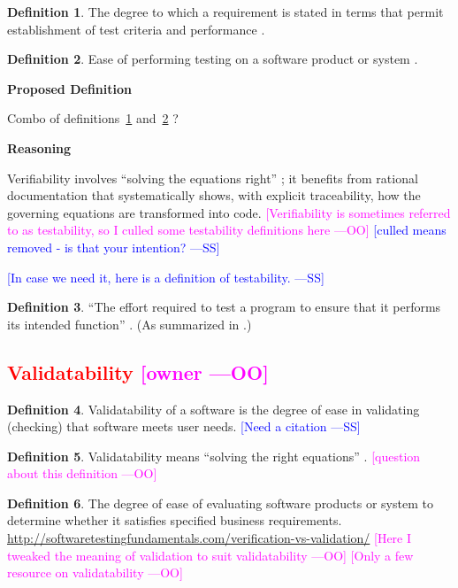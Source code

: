 \documentclass[letterpaper,cleveref]{lipics-v2019}
\newcommand{\authornote}[3]{\textcolor{#1}{[#3 ---#2]}}
\newcommand{\authornote}[3]{}
\newcommand{\wss}[1]{\authornote{blue}{SS}{#1}} %
\newcommand{\oo}[1]{\authornote{magenta}{OO}{#1}} %
\newcommand{\notdone}[1]{\textcolor{red}{#1}}
\theoremstyle{definition}
\newtheorem{defn}{Definition}
\begin{document}
\begin{defn} \label{Defn_Verifiability1}
	The degree to which a requirement is stated in terms that permit establishment
	of test criteria and performance \citep{IEEEStdGlossarySET1990}.
\end{defn}

\begin{defn} \label{Defn_Verifiability2}
	Ease of performing testing on a software product or system
	\citep{IEEEStdGlossarySET1990}.
\end{defn}

\noindent \textbf{Proposed Definition}

Combo of definitions~\ref{Defn_Verifiability1} and~\ref{Defn_Verifiability2} ?

\noindent \textbf{Reasoning}

Verifiability involves ``solving the equations right''
\citep[p.~23]{Roache1998};
it benefits from rational documentation that systematically shows, with explicit
traceability, how the governing equations are transformed into code.
\oo{Verifiability is sometimes referred to as testability, so I culled some
	testability definitions here}  \wss{culled means removed - is that your
	intention?}

\wss{In case we need it, here is a definition of testability.}

\begin{defn}
	``The effort required to test a program to ensure that it performs its
	intended function'' \citep{McCallEtAl1977}. (As summarized in
	\citet{VanVliet2000}.)
\end{defn}


\subsection{\notdone{Validatability} \oo{owner}}

\begin{defn}
	Validatability of a software is the degree of ease in validating (checking)
	that software meets user needs. \wss{Need a citation}
\end{defn}

\begin{defn}
	Validatability means ``solving the right equations''
	\citep[p.~23]{Roache1998}.
	\oo{question about this definition}
\end{defn}

\begin{defn} \label{DefnValidatability}
	The degree of ease of evaluating software products or system to determine
	whether it satisfies specified business
	requirements.
	\url{http://softwaretestingfundamentals.com/verification-vs-validation/}
	\oo{Here I tweaked the meaning of validation to suit validatability} \oo{Only
		a few resource on validatability}
\end{defn}
\end{document}
